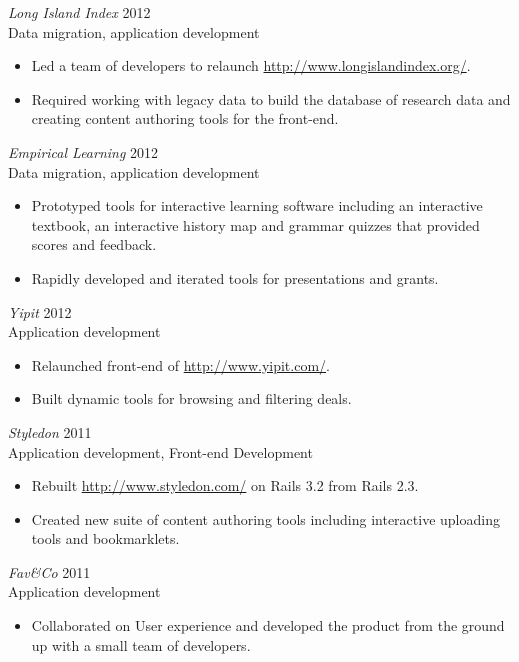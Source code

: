 \documentclass[line,margin]{res}
\begin{document}
\begin{resume}
    {\sl Long Island Index}
    \hfill 2012 \\
    Data migration, application development
    \begin{itemize} \itemsep -2pt
        \item
            Led a team of developers to relaunch \url{http://www.longislandindex.org/}.
        \item
            Required working with legacy data to build the database of research data and
            creating content authoring tools for the front-end.
    \end{itemize}


    {\sl Empirical Learning}
    \hfill 2012 \\
    Data migration, application development
    \begin{itemize} \itemsep -2pt
        \item
            Prototyped tools for interactive learning software including an interactive textbook, an
            interactive history map and grammar quizzes that provided scores and feedback.
        \item
            Rapidly developed and iterated tools for presentations and grants.
    \end{itemize}


    \begin{samepage}
    {\sl Yipit}
    \hfill 2012 \\
    Application development
    \begin{itemize} \itemsep -2pt
        \item
            Relaunched front-end of \url{http://www.yipit.com/}.
        \item
            Built dynamic tools for browsing and filtering deals.
    \end{itemize}
    \end{samepage}

    {\sl Styledon}
    \hfill 2011 \\
    Application development, Front-end Development
    \begin{itemize} \itemsep -2pt
        \item
            Rebuilt \url{http://www.styledon.com/} on Rails 3.2 from Rails 2.3.
        \item
            Created new suite of content authoring tools including interactive uploading tools
            and bookmarklets.
    \end{itemize}

    {\sl Fav\&Co}
    \hfill 2011 \\
    Application development
    \begin{itemize} \itemsep -2pt
        \item
            Collaborated on User experience and developed the
            product from the ground up with a small team of developers.
    \end{itemize}


\end{resume}
\end{document}
